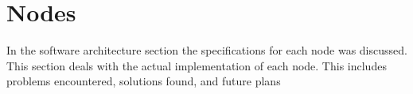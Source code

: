 \part{Nodes}
In the software architecture section the specifications for each node
was discussed.  This section deals with the actual implementation of
each node.  This includes problems encountered, solutions found, and
future plans




















